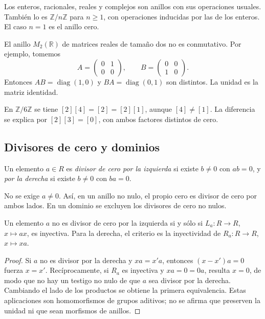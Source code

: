 \begin{ejem}
Los enteros, racionales, reales y complejos son anillos con sus operaciones usuales. También lo es $\mathbb Z/n\mathbb Z$ para $n\geq1$, con operaciones inducidas por las de los enteros. El caso $n=1$ es el anillo cero.

El anillo $M_2(\mathbb R)$ de matrices reales de tamaño dos no es conmutativo. Por ejemplo, tomemos
\[
A=\begin{pmatrix}0&1\\0&0\end{pmatrix},\qquad
B=\begin{pmatrix}0&0\\1&0\end{pmatrix}.
\]
Entonces $AB=\operatorname{diag}(1,0)$ y $BA=\operatorname{diag}(0,1)$ son distintos. La unidad es la matriz identidad.
\end{ejem}

\begin{ejem}
En $\mathbb Z/6\mathbb Z$ se tiene $[2][4]=[2]=[2][1]$, aunque $[4]\ne[1]$. La diferencia se explica por $[2][3]=[0]$, con ambos factores distintos de cero.
\end{ejem}

\subsection{Divisores de cero y dominios}
\begin{defi}
Un elemento $a\in R$ es \emph{divisor de cero por la izquierda} si existe $b\ne0$ con $ab=0$, y \emph{por la derecha} si existe $b\ne0$ con $ba=0$.
\end{defi}
No se exige $a\ne0$. Así, en un anillo no nulo, el propio cero es divisor de cero por ambos lados. En un dominio se excluyen los divisores de cero no nulos.

\begin{prop}\label{prop:C11-cancelacion}
Un elemento $a$ no es divisor de cero por la izquierda si y sólo si $L_a:R\to R$, $x\mapsto ax$, es inyectiva. Para la derecha, el criterio es la inyectividad de $R_a:R\to R$, $x\mapsto xa$.
\end{prop}
\begin{proof}
Si $a$ no es divisor por la derecha y $xa=x'a$, entonces $(x-x')a=0$ fuerza $x=x'$. Recíprocamente, si $R_a$ es inyectiva y $xa=0=0a$, resulta $x=0$, de modo que no hay un testigo no nulo de que $a$ sea divisor por la derecha. Cambiando el lado de los productos se obtiene la primera equivalencia. Estas aplicaciones son homomorfismos de grupos aditivos; no se afirma que preserven la unidad ni que sean morfismos de anillos.
\end{proof}

